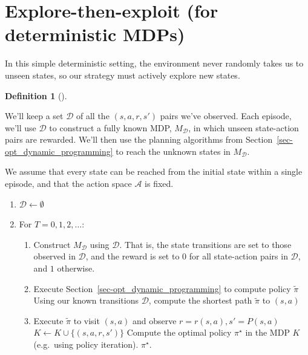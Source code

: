 \documentclass[
  letterpaper,
  DIV=11,
  numbers=noendperiod]{scrreprt}
\providecommand{\tightlist}{%
  \setlength{\itemsep}{0pt}\setlength{\parskip}{0pt}}\usepackage{longtable,booktabs,array}
\theoremstyle{plain}
\theoremstyle{plain}
\theoremstyle{definition}
\theoremstyle{definition}
\newtheorem{definition}{Definition}[chapter]
\theoremstyle{remark}
\begin{document}
\section{Explore-then-exploit (for deterministic
MDPs)}\label{explore-then-exploit-for-deterministic-mdps}

In this simple deterministic setting, the environment never randomly
takes us to unseen states, so our strategy must actively explore new
states.

\begin{definition}[]\protect\hypertarget{def-explore_then_exploit}{}\label{def-explore_then_exploit}

We'll keep a set \(\mathcal{D}\) of all the \((s, a, r, s')\) pairs
we've observed. Each episode, we'll use \(\mathcal{D}\) to construct a
fully known MDP, \(M_{\mathcal{D}}\), in which unseen state-action pairs
are rewarded. We'll then use the planning algorithms from
Section~\ref{sec-opt_dynamic_programming} to reach the unknown states in
\(M_{\mathcal{D}}\).

We assume that every state can be reached from the initial state within
a single episode, and that the action space \(\mathcal{A}\) is fixed.

\begin{enumerate}
\def\labelenumi{\arabic{enumi}.}
\tightlist
\item
  \(\mathcal{D} \gets \emptyset\)
\item
  For \(T = 0, 1, 2, \dots\):

  \begin{enumerate}
  \def\labelenumii{\arabic{enumii}.}
  \tightlist
  \item
    Construct \(M_{\mathcal{D}}\) using \(\mathcal{D}\). That is, the
    state transitions are set to those observed in \(\mathcal{D}\), and
    the reward is set to \(0\) for all state-action pairs in
    \(\mathcal{D}\), and \(1\) otherwise.
  \item
    Execute Section~\ref{sec-opt_dynamic_programming} to compute policy
    \(\widetilde \pi\) Using our known transitions \(\mathcal{D}\),
    compute the shortest path \(\tilde \pi\) to \((s, a)\)
  \item
    Execute \(\tilde \pi\) to visit \((s, a)\) and observe
    \(r = r(s, a), s' = P(s, a)\) \(K \gets K \cup \{ (s, a, r, s') \}\)
    Compute the optimal policy \(\pi^\star\) in the MDP \(K\)
    (e.g.~using policy iteration). \(\pi^\star\).
  \end{enumerate}
\end{enumerate}

\end{definition}
\end{document}
